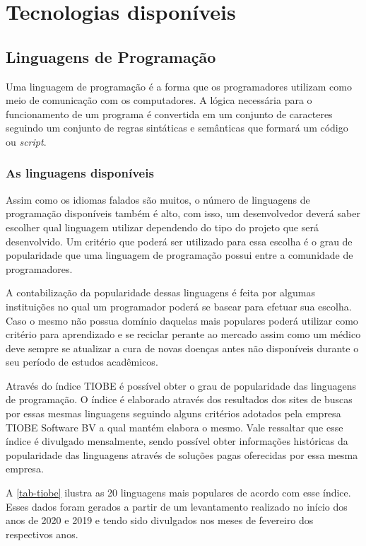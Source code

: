 \chapter{Tecnologias disponíveis} \label{Tecnologias disponíveis}

\section{Linguagens de Programação}

Uma linguagem de programação é a forma que os programadores utilizam como meio de comunicação com os computadores. A lógica necessária para o funcionamento de um programa é convertida em um conjunto de caracteres seguindo um conjunto de regras sintáticas e semânticas que formará um código ou \textit{script}.

\subsection{As linguagens disponíveis}

Assim como os idiomas falados são muitos, o número de linguagens de programação disponíveis também é alto, com isso, um desenvolvedor deverá saber escolher qual linguagem utilizar dependendo do tipo do projeto que será desenvolvido. Um critério que poderá ser utilizado para essa escolha é o grau de popularidade que uma linguagem de programação possui entre a comunidade de programadores.

A contabilização da popularidade dessas linguagens é feita por algumas instituições no qual um programador poderá se basear para efetuar sua escolha. Caso o mesmo não possua domínio daquelas mais populares poderá utilizar como critério para aprendizado e se reciclar perante ao mercado assim como um médico deve sempre se atualizar a cura de novas doenças antes não disponíveis durante o seu período de estudos acadêmicos.

Através do índice TIOBE é possível obter o grau de popularidade das linguagens de programação. O índice é elaborado através dos resultados dos sites de buscas por essas mesmas linguagens seguindo alguns critérios adotados pela empresa TIOBE Software BV a qual mantém elabora o mesmo. Vale ressaltar que esse índice é divulgado mensalmente, sendo possível obter informações históricas da popularidade das linguagens através de soluções pagas oferecidas por essa mesma empresa.

A \autoref{tab-tiobe} ilustra as 20 linguagens mais populares de acordo com esse índice. Esses dados foram gerados a partir de um levantamento realizado no início dos anos de 2020 e 2019 e tendo sido divulgados nos meses de fevereiro dos respectivos anos.

